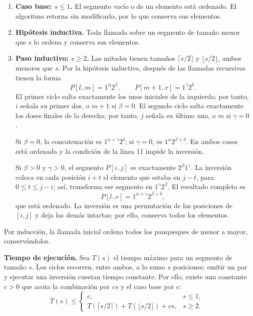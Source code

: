 \begin{enumerate}
\item \textbf{Caso base: $s\le1$.} El segmento vacío o de un elemento está ordenado. El algoritmo retorna sin modificarlo, por lo que conserva sus elementos.

\item \textbf{Hipótesis inductiva.} Toda llamada sobre un segmento de tamaño menor que $s$ lo ordena y conserva sus elementos.

\item \textbf{Paso inductivo: $s\ge2$.} Las mitades tienen tamaños $\lceil s/2\rceil$ y $\lfloor s/2\rfloor$, ambos menores que $s$. Por la hipótesis inductiva, después de las llamadas recursivas tienen la forma
\[
P[l..m]=1^\alpha2^\beta,
\qquad
P[m+1..r]=1^\gamma2^\delta.
\]
El primer ciclo salta exactamente los unos iniciales de la izquierda; por tanto, $i$ señala su primer dos, o $m+1$ si $\beta=0$. El segundo ciclo salta exactamente los doses finales de la derecha; por tanto, $j$ señala su último uno, o $m$ si $\gamma=0$.

Si $\beta=0$, la concatenación es $1^{\alpha+\gamma}2^\delta$; si $\gamma=0$, es $1^\alpha2^{\beta+\delta}$. En ambos casos está ordenada y la condición de la línea 11 impide la inversión.

Si $\beta>0$ y $\gamma>0$, el segmento $P[i..j]$ es exactamente $2^\beta1^\gamma$. La inversión coloca en cada posición $i+t$ el elemento que estaba en $j-t$, para $0\le t\le j-i$; así, transforma ese segmento en $1^\gamma2^\beta$. El resultado completo es
\[
P[l..r]=1^{\alpha+\gamma}2^{\beta+\delta},
\]
que está ordenado. La inversión es una permutación de las posiciones de $[i,j]$ y deja las demás intactas; por ello, conserva todos los elementos.
\end{enumerate}

Por inducción, la llamada inicial ordena todos los panqueques de menor a mayor, conservándolos.

\textbf{Tiempo de ejecución.} Sea $T(s)$ el tiempo máximo para un segmento de tamaño $s$. Los ciclos recorren, entre ambos, a lo sumo $s$ posiciones; emitir un par y ejecutar una inversión cuestan tiempo constante. Por ello, existe una constante $c>0$ que acota la combinación por $cs$ y el caso base por $c$:
\[
T(s)\le
\begin{cases}
c, & s\le1,\\
T(\lceil s/2\rceil)+T(\lfloor s/2\rfloor)+cs, & s\ge2.
\end{cases}
\]

